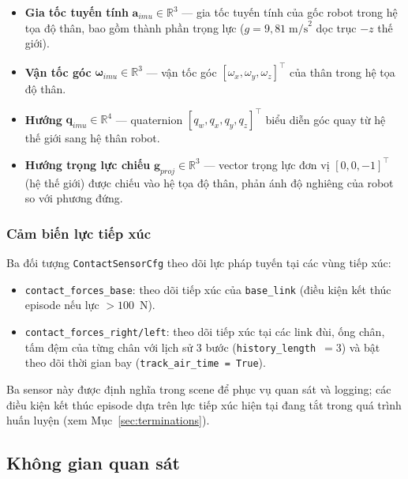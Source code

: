 \begin{itemize}
    \item \textbf{Gia tốc tuyến tính} $\mathbf{a}_{imu} \in \mathbb{R}^3$ —
    gia tốc tuyến tính của gốc robot trong hệ tọa độ thân, bao gồm thành
    phần trọng lực ($g = 9{,}81\;\text{m/s}^2$ dọc trục $-z$ thế giới).

    \item \textbf{Vận tốc góc} $\boldsymbol{\omega}_{imu} \in \mathbb{R}^3$ —
    vận tốc góc $[\omega_x, \omega_y, \omega_z]^{\top}$ của thân trong hệ
    tọa độ thân.

    \item \textbf{Hướng} $\mathbf{q}_{imu} \in \mathbb{R}^4$ — quaternion
    $[q_w, q_x, q_y, q_z]^{\top}$ biểu diễn góc quay từ hệ thế giới sang
    hệ thân robot.

    \item \textbf{Hướng trọng lực chiếu} $\mathbf{g}_{proj} \in \mathbb{R}^3$ —
    vector trọng lực đơn vị $[0, 0, -1]^{\top}$ (hệ thế giới) được chiếu vào
    hệ tọa độ thân, phản ánh độ nghiêng của robot so với phương đứng.
\end{itemize}

\subsubsection{Cảm biến lực tiếp xúc}

Ba đối tượng \texttt{ContactSensorCfg} theo dõi lực pháp tuyến tại các
vùng tiếp xúc:

\begin{itemize}
    \item \texttt{contact\_forces\_base}: theo dõi tiếp xúc của
    \texttt{base\_link} (điều kiện kết thúc episode nếu lực $> 100$~N).
    \item \texttt{contact\_forces\_right/left}: theo dõi tiếp xúc tại
    các link đùi, ống chân, tấm đệm của từng chân với lịch sử 3 bước
    (\texttt{history\_length}~$= 3$) và bật theo dõi thời gian bay
    (\texttt{track\_air\_time = True}).
\end{itemize}

Ba sensor này được định nghĩa trong scene để phục vụ quan sát và logging;
các điều kiện kết thúc episode dựa trên lực tiếp xúc hiện tại đang tắt
trong quá trình huấn luyện (xem Mục~\ref{sec:terminations}).

\subsection{Không gian quan sát}

